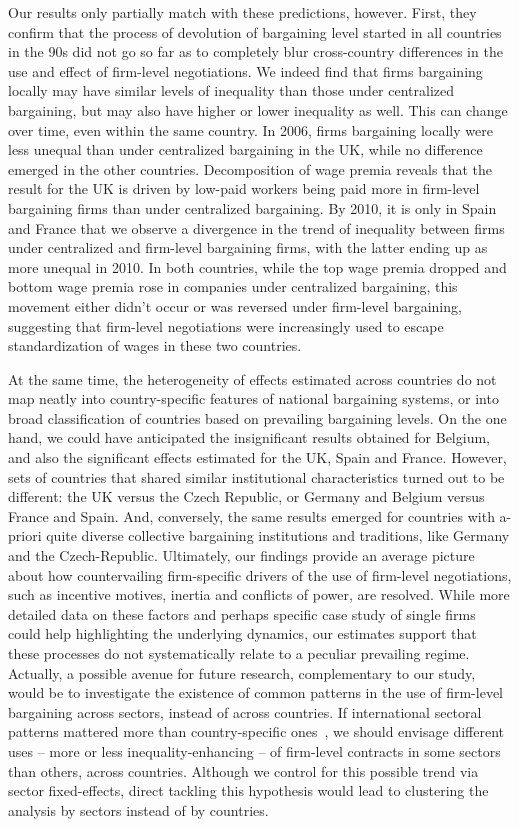 \documentclass[12pt]{article}
\begin{document}
Our results only partially match with these predictions, however. First, they confirm that the process of devolution of bargaining level started in all countries in the 90s did not go so far as to completely blur cross-country differences in the use and effect of firm-level negotiations. We indeed find that firms bargaining locally may have similar levels of inequality than those under centralized bargaining, but may also have higher or lower inequality as well. This can change over time, even within the same country. In 2006, firms bargaining locally were less unequal than under centralized bargaining in the UK, while no difference emerged in the other countries. Decomposition of wage premia reveals that the result for the UK is driven by low-paid workers being paid more in firm-level bargaining firms than under centralized bargaining. By 2010, it is only in Spain and France that we observe a divergence in the trend of inequality between firms under centralized and firm-level bargaining firms, with the latter ending up as more unequal in 2010. In both countries, while the top wage premia dropped and bottom wage premia rose in companies under centralized bargaining, this movement either didn't occur or was reversed under firm-level bargaining, suggesting that firm-level negotiations were increasingly used to escape standardization of wages in these two countries. 

At the same time, the heterogeneity of effects estimated across countries do not map neatly into country-specific features of national bargaining systems, or into broad classification of countries based on prevailing bargaining levels. On the one hand, we could have anticipated the insignificant results obtained for Belgium, and also the significant effects estimated for the UK, Spain and France. However, sets of countries that shared similar institutional characteristics turned out to be different: the UK versus the Czech Republic, or Germany and Belgium versus France and Spain. And, conversely, the same results emerged for countries with a-priori quite diverse collective bargaining institutions and traditions, like Germany and the Czech-Republic. Ultimately, our findings provide an average picture about how countervailing firm-specific drivers of the use of firm-level negotiations, such as incentive motives, inertia and conflicts of power, are resolved. While more detailed data on these factors and perhaps specific case study of single firms could help highlighting the underlying dynamics, our estimates support that these processes do not systematically relate to a peculiar prevailing regime. Actually, a possible avenue for future research, complementary to our study, would be to investigate the existence of common patterns in the use of firm-level bargaining across sectors, instead of across countries. If international sectoral patterns mattered more than country-specific ones~\citep[as suggested in ][]{bechter2012sectors}, we should envisage different uses -- more or less inequality-enhancing -- of firm-level contracts in some sectors than others, across countries. Although we control for this possible trend via sector fixed-effects, direct tackling this hypothesis would lead to clustering the analysis by sectors instead of by countries. 
\end{document}
